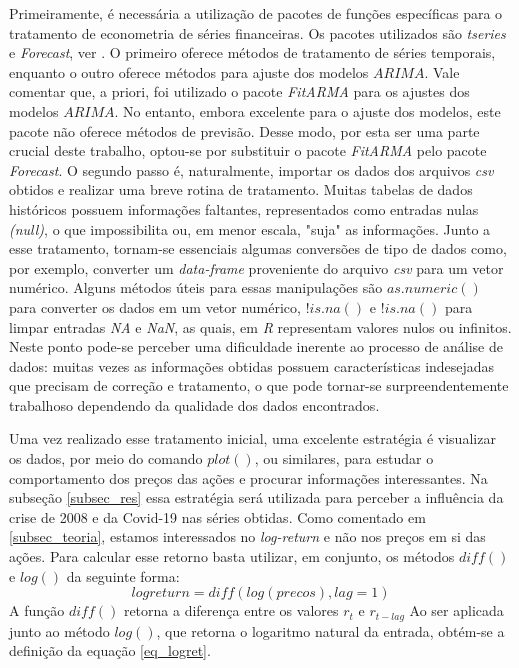 \documentclass[12pt]{article}
\begin{document}
Primeiramente, é necessária a utilização de pacotes de funções específicas para o tratamento de econometria de séries financeiras. Os pacotes utilizados são  \emph{tseries} e \emph{Forecast}, ver \cite{CRANR}. O primeiro oferece métodos de tratamento de séries temporais, enquanto o outro oferece métodos para ajuste dos modelos $ARIMA$. Vale comentar que, a priori, foi utilizado o pacote \emph{FitARMA} para os ajustes dos modelos $ARIMA$. No entanto, embora excelente para o ajuste dos modelos, este pacote não oferece métodos de previsão. Desse modo, por esta ser uma parte crucial deste trabalho, optou-se por substituir o pacote \emph{FitARMA} pelo pacote \emph{Forecast}. O segundo passo é, naturalmente, importar os dados dos arquivos \textit{csv} obtidos e realizar uma breve rotina de tratamento. Muitas tabelas de dados históricos possuem informações faltantes, representados como entradas nulas \textit{(null)}, o que impossibilita ou, em menor escala, "suja" as informações. Junto a esse tratamento, tornam-se essenciais algumas conversões de tipo de dados como, por exemplo, converter um \textit{data-frame} proveniente do arquivo \textit{csv} para um vetor numérico. Alguns métodos úteis para essas manipulações são $as.numeric()$ para converter os dados em um vetor numérico, $!is.na()$ e $!is.na()$ para limpar entradas \textit{NA} e \textit{NaN}, as quais, em \emph{R} representam valores nulos ou infinitos. Neste ponto pode-se perceber uma dificuldade inerente ao processo de análise de dados: muitas vezes as informações obtidas possuem características indesejadas que precisam de correção e tratamento, o que pode tornar-se surpreendentemente trabalhoso dependendo da qualidade dos dados encontrados.

Uma vez realizado esse tratamento inicial, uma excelente estratégia é visualizar os dados, por meio do comando $plot()$, ou similares, para estudar o comportamento dos preços das ações e procurar informações interessantes. Na subseção \ref{subsec_res} essa estratégia será utilizada para perceber a influência da crise de 2008 e da Covid-19 nas séries obtidas. Como comentado em \ref{subsec_teoria}, estamos interessados no \textit{log-return} e não nos preços em si das ações. Para calcular esse retorno basta utilizar, em conjunto, os métodos $diff()$ e $log()$ da seguinte forma:
\begin{equation*}
logreturn=diff(log(precos),lag=1)
\end{equation*}
A função $diff()$ retorna a diferença entre os valores $r_{t}$ e $r_{t-lag}$ Ao ser aplicada junto ao método $log()$, que retorna o logaritmo natural da entrada, obtém-se a definição da equação \ref{eq_logret}.
\end{document}

